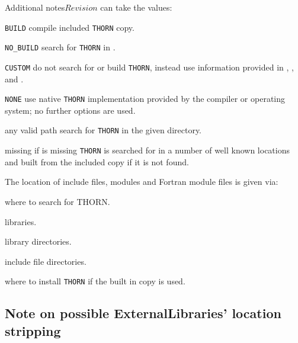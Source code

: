 \begin{cactuspart}{Additional notes}{}{$Revision$}
\texttt{} can take the values:
\begin{Lentry}
\item [\texttt{BUILD}] compile included \texttt{THORN} copy.
\item [\texttt{NO\_BUILD}] search for \texttt{THORN} in
      \texttt{}.
\item [\texttt{CUSTOM}] do not search for or build \texttt{THORN}, instead use
      information provided in \texttt{},
      \texttt{}, and \texttt{}.
\item [\texttt{NONE}] use native \texttt{THORN} implementation provided by the
      compiler or operating system; no further options are used.
\item [any valid path] search for \texttt{THORN} in the given directory.
\item [missing] if \texttt{} is missing \texttt{THORN} is searched for in
      a number of well known locations and built from the included copy if
      it is not found.
\end{Lentry}


The location of include files, modules and Fortran module files is given via:
\begin{Lentry}
\item [\texttt{\var{THORN\_DIR}}] where to search for THORN.
\item [\texttt{\var{THORN\_LIBS}}] libraries.
\item [\texttt{\var{THORN\_LIB\_DIRS}}] library directories.
\item [\texttt{\var{THORN\_INC\_DIRS}}] include file directories.
\item [\texttt{\var{THORN\_INSTALL\_DIR}}] where to install \texttt{THORN} if the
      built in copy is used.
\end{Lentry}

\subsection{Note on possible ExternalLibraries' location stripping}
\label{sec:stripping}


\end{cactuspart}
